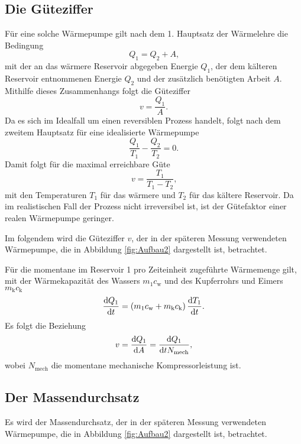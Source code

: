 \subsection{Die Güteziffer}
Für eine solche Wärmepumpe gilt nach dem 1. Hauptsatz der Wärmelehre die Bedingung
\begin{equation}
Q_1 = Q_2 + A\label{eq:Q1}\text{,}
\end{equation}
mit der an das wärmere Reservoir abgegeben Energie $Q_1$, der dem kälteren
Reservoir entnommenen Energie $Q_2$ und der zusätzlich benötigten Arbeit $A$.
Mithilfe dieses Zusammenhangs folgt die Güteziffer
\begin{equation}
v = \frac{Q_1}{A}\label{eq:v1}\text{.}
\end{equation}
Da es sich im Idealfall um einen reversiblen Prozess handelt, folgt nach dem zweitem Hauptsatz für eine idealisierte Wärmepumpe
\begin{equation}
\frac{Q_1}{T_1}-\frac{Q_2}{T_2}=0\label{eq:redQ}\text{.}
\end{equation}
Damit folgt für die maximal erreichbare Güte
\begin{equation}
v = \frac{T_1}{T_1-T_2}\label{eq:vid}\text{,}
\end{equation}
mit den Temperaturen $T_1$ für das wärmere und $T_2$ für das kältere Reservoir.
Da im realistischen Fall der Prozess nicht irreversibel ist, ist der Gütefaktor einer realen Wärmepumpe geringer.


Im folgendem wird die Güteziffer $v$, der in der späteren Messung verwendeten Wärmepumpe, die in Abbildung \ref{fig:Aufbau2} dargestellt ist, betrachtet.


Für die momentane im Reservoir 1 pro Zeiteinheit zugeführte Wärmemenge gilt, mit der Wärmekapazität des Wassers $m_1c_\text{w}$ und des Kupferrohrs und Eimers $m_\text{k}c_\text{k}$
\begin{equation}
  \frac{\mathop{}\!\mathrm{d} Q_1}{\mathop{}\!\mathrm{d} t} = \left( m_1c_\text{w} + m_\text{k}c_\text{k}\right) \frac{\mathop{}\!\mathrm{d} T_1}{\mathop{}\!\mathrm{d} t}\text{.}\label{eq:T1Q1}
\end{equation}
Es folgt die Beziehung
\begin{equation}
	v = \frac{\mathop{}\!\mathrm{d} Q_1}{\mathop{}\!\mathrm{d} A} = \frac{\mathop{}\!\mathrm{d} Q_1}{\mathop{}\!\mathrm{d} t N_\text{mech}}\text{,}\label{eq:v}
\end{equation}
wobei $N_\text{mech}$ die momentane mechanische Kompressorleistung ist.

\subsection{Der Massendurchsatz}
Es wird der Massendurchsatz, der in der späteren Messung verwendeten Wärmepumpe, die in Abbildung \ref{fig:Aufbau2} dargestellt ist, betrachtet.



